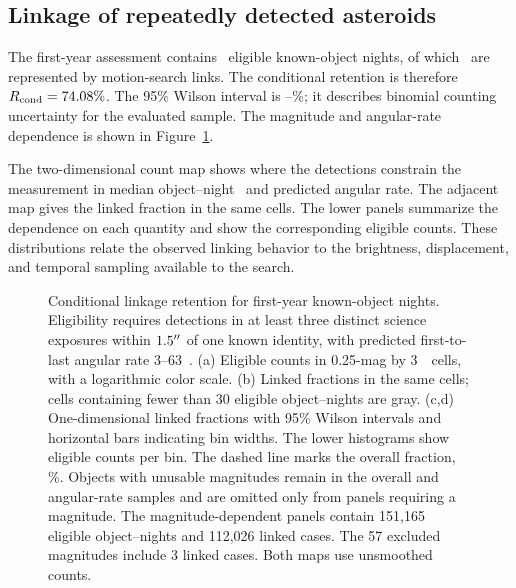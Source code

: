 \subsection{Linkage of repeatedly detected asteroids}
\label{sec:retention_results}

The first-year assessment contains \yrNEligible\ eligible known-object
nights, of which \yrNLinked\ are represented by motion-search links.
The conditional retention is therefore $R_{\rm cond}=74.08\%$.
The 95\% Wilson interval is \yrRetentionLow--\yrRetentionHigh\%;
it describes binomial counting uncertainty for the evaluated sample.
The magnitude and angular-rate dependence is shown in
Figure~\ref{fig:retention}.

The two-dimensional count map shows where the detections constrain
the measurement in median object--night \gaper\ and predicted
angular rate. The adjacent map gives the linked fraction in the
same cells. The lower panels summarize the dependence on each
quantity and show the corresponding eligible counts. These
distributions relate the observed linking behavior to the brightness,
displacement, and temporal sampling available to the search.

\begin{figure}[tbp]
\centering
{}
\caption{Conditional linkage retention for first-year known-object
nights. Eligibility requires detections in at least three distinct
science exposures within $1.5^{\prime\prime}$ of one known identity, with
predicted first-to-last angular rate $3$--$63$~\rateunit.
(a) Eligible counts in 0.25-mag by 3~\rateunit\ cells, with a
logarithmic color scale. (b) Linked fractions in the same cells;
cells containing fewer than 30 eligible object--nights are gray.
(c,d) One-dimensional linked fractions with 95\% Wilson intervals
and horizontal bars indicating bin widths. The lower histograms
show eligible counts per bin. The dashed line marks the overall
fraction, \yrRetention\%. Objects with unusable magnitudes remain
in the overall and angular-rate samples and are omitted only from
panels requiring a magnitude. The magnitude-dependent panels contain
151,165 eligible object--nights and
112,026 linked cases. The
57 excluded magnitudes include
3 linked cases. Both maps use unsmoothed counts.}
\label{fig:retention}
\end{figure}
